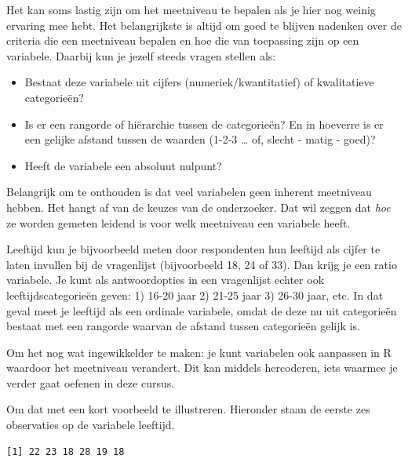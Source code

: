 \documentclass[
  letterpaper,
  DIV=11,
  numbers=noendperiod]{scrreprt}
\newenvironment{Shaded}{\begin{snugshade}}{\end{snugshade}}
\newcommand{\CommentTok}[1]{\textcolor[rgb]{0.37,0.37,0.37}{#1}}
\newcommand{\FunctionTok}[1]{\textcolor[rgb]{0.28,0.35,0.67}{#1}}
\newcommand{\NormalTok}[1]{\textcolor[rgb]{0.00,0.23,0.31}{#1}}
\newcommand{\SpecialCharTok}[1]{\textcolor[rgb]{0.37,0.37,0.37}{#1}}
\providecommand{\tightlist}{%
  \setlength{\itemsep}{0pt}\setlength{\parskip}{0pt}}
\begin{document}
Het kan soms lastig zijn om het meetniveau te bepalen als je hier nog
weinig ervaring mee hebt. Het belangrijkste is altijd om goed te blijven
nadenken over de criteria die een meetniveau bepalen en hoe die van
toepassing zijn op een variabele. Daarbij kun je jezelf steeds vragen
stellen als:

\begin{itemize}
\tightlist
\item
  Bestaat deze variabele uit cijfers (numeriek/kwantitatief) of
  kwalitatieve categorieën?
\item
  Is er een rangorde of hiërarchie tussen de categorieën? En in hoeverre
  is er een gelijke afstand tussen de waarden (1-2-3 \ldots{} of, slecht
  - matig - goed)?
\item
  Heeft de variabele een absoluut nulpunt?
\end{itemize}

Belangrijk om te onthouden is dat veel variabelen geen inherent
meetniveau hebben. Het hangt af van de keuzes van de onderzoeker. Dat
wil zeggen dat \emph{hoe} ze worden gemeten leidend is voor welk
meetniveau een variabele heeft.

Leeftijd kun je bijvoorbeeld meten door respondenten hun leeftijd als
cijfer te laten invullen bij de vragenlijst (bijvoorbeeld 18, 24 of 33).
Dan krijg je een ratio variabele. Je kunt als antwoordopties in een
vragenlijst echter ook leeftijdscategorieën geven: 1) 16-20 jaar 2)
21-25 jaar 3) 26-30 jaar, etc. In dat geval meet je leeftijd als een
ordinale variabele, omdat de deze nu uit categorieën bestaat met een
rangorde waarvan de afstand tussen categorieën gelijk is.

Om het nog wat ingewikkelder te maken: je kunt variabelen ook aanpassen
in R waardoor het meetniveau verandert. Dit kan middels hercoderen, iets
waarmee je verder gaat oefenen in deze cursus.

Om dat met een kort voorbeeld te illustreren. Hieronder staan de eerste
zes observaties op de variabele leeftijd.

\begin{Shaded}
\end{Shaded}

\begin{verbatim}
[1] 22 23 18 28 19 18
\end{verbatim}
\end{document}

